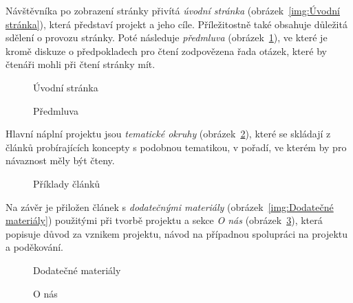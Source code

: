\documentclass[a4paper, 12pt]{article}
\begin{document}
  Návštěvníka po zobrazení stránky přivítá \emph{úvodní stránka} (obrázek~\ref{img:Úvodní stránka}), která představí projekt a jeho cíle. Příležitostně také obsahuje důležitá sdělení o provozu stránky. Poté následuje \emph{předmluva} (obrázek~\ref{img:Předmluva}), ve které je kromě diskuze o předpokladech pro čtení zodpovězena řada otázek, které by čtenáři mohli při čtení stránky mít.

  \begin{figure}[H]
      \caption{Úvodní stránka} \label{img:Úvodní stránka}
    \endminipage\hfill
      \caption{Předmluva} \label{img:Předmluva}
    \endminipage
  \end{figure}

  Hlavní náplní projektu jsou \emph{tematické okruhy} (obrázek~\ref{img:Příklady článků}), které se skládají z článků probírajících koncepty s podobnou tematikou, v pořadí, ve kterém by pro návaznost měly být čteny.

  \begin{figure}[H]
    \centering

    \hfill
    \hfill

    \caption{Příklady článků}%
    \label{img:Příklady článků}%
  \end{figure}

  Na závěr je přiložen článek s \emph{dodatečnými materiály} (obrázek~\ref{img:Dodatečné materiály}) použitými při tvorbě projektu a sekce \emph{O nás} (obrázek~\ref{img:O nás}), která popisuje důvod za vznikem projektu, návod na případnou spolupráci na projektu a poděkování.

  \begin{figure}[H]
      \caption{Dodatečné materiály} \label{img:Dodatečné materiály}
    \endminipage\hfill
      \caption{O nás} \label{img:O nás}
    \endminipage
  \end{figure}
\end{document}
